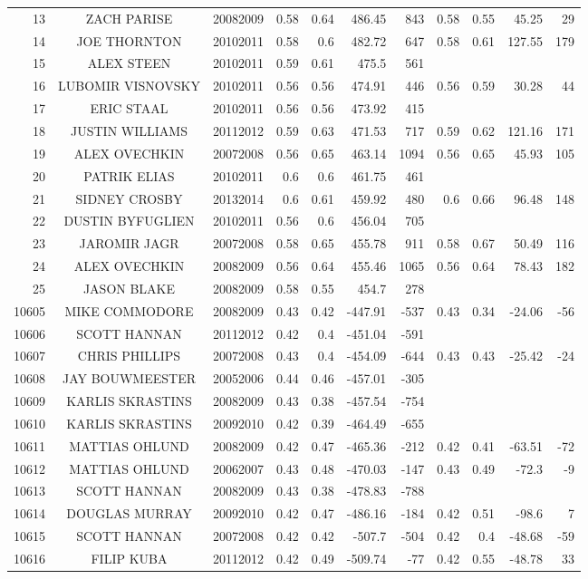 \begin{table}[p]
\begin{tabular}{r c c | r r r r | r r r r }
13&ZACH PARISE&20082009&0.58&0.64&486.45&843&0.58&0.55&45.25&29\\
14&JOE THORNTON&20102011&0.58&0.6&482.72&647&0.58&0.61&127.55&179\\
15&ALEX STEEN&20102011&0.59&0.61&475.5&561&&&&\\
16&LUBOMIR VISNOVSKY&20102011&0.56&0.56&474.91&446&0.56&0.59&30.28&44\\
17&ERIC STAAL&20102011&0.56&0.56&473.92&415&&&&\\
18&JUSTIN WILLIAMS&20112012&0.59&0.63&471.53&717&0.59&0.62&121.16&171\\
19&ALEX OVECHKIN&20072008&0.56&0.65&463.14&1094&0.56&0.65&45.93&105\\
20&PATRIK ELIAS&20102011&0.6&0.6&461.75&461&&&&\\
21&SIDNEY CROSBY&20132014&0.6&0.61&459.92&480&0.6&0.66&96.48&148\\
22&DUSTIN BYFUGLIEN&20102011&0.56&0.6&456.04&705&&&&\\
23&JAROMIR JAGR&20072008&0.58&0.65&455.78&911&0.58&0.67&50.49&116\\
24&ALEX OVECHKIN&20082009&0.56&0.64&455.46&1065&0.56&0.64&78.43&182\\
25&JASON BLAKE&20082009&0.58&0.55&454.7&278&&&&\\
\hline\rule{0pt}{4ex}
10605&MIKE COMMODORE&20082009&0.43&0.42&-447.91&-537&0.43&0.34&-24.06&-56\\
10606&SCOTT HANNAN&20112012&0.42&0.4&-451.04&-591&&&&\\
10607&CHRIS PHILLIPS&20072008&0.43&0.4&-454.09&-644&0.43&0.43&-25.42&-24\\
10608&JAY BOUWMEESTER&20052006&0.44&0.46&-457.01&-305&&&&\\
10609&KARLIS SKRASTINS&20082009&0.43&0.38&-457.54&-754&&&&\\
10610&KARLIS SKRASTINS&20092010&0.42&0.39&-464.49&-655&&&&\\
10611&MATTIAS OHLUND&20082009&0.42&0.47&-465.36&-212&0.42&0.41&-63.51&-72\\
10612&MATTIAS OHLUND&20062007&0.43&0.48&-470.03&-147&0.43&0.49&-72.3&-9\\
10613&SCOTT HANNAN&20082009&0.43&0.38&-478.83&-788&&&&\\
10614&DOUGLAS MURRAY&20092010&0.42&0.47&-486.16&-184&0.42&0.51&-98.6&7\\
10615&SCOTT HANNAN&20072008&0.42&0.42&-507.7&-504&0.42&0.4&-48.68&-59\\
10616&FILIP KUBA&20112012&0.42&0.49&-509.74&-77&0.42&0.55&-48.78&33\\

\end{tabular}
\end{table}
